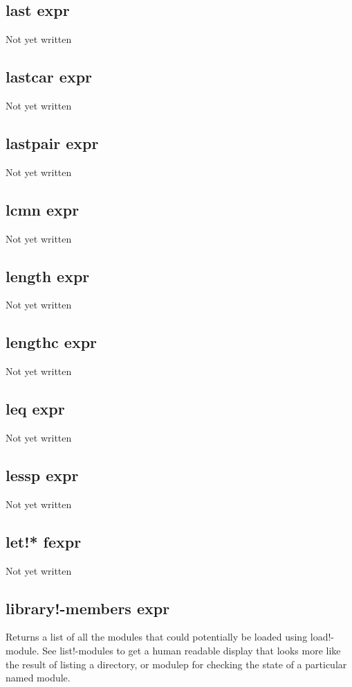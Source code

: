 \documentclass[a4paper,11pt]{article}
\begin{document}
\subsection{\ttfamily last expr}
Not yet written

\subsection{\ttfamily lastcar expr}
Not yet written

\subsection{\ttfamily lastpair expr}
Not yet written

\subsection{\ttfamily lcmn expr}
Not yet written

\subsection{\ttfamily length expr}
Not yet written

\subsection{\ttfamily lengthc expr}
Not yet written

\subsection{\ttfamily leq expr}
Not yet written

\subsection{\ttfamily lessp expr}
Not yet written

\subsection{\ttfamily let!* fexpr}
Not yet written

\subsection{\ttfamily library!-members expr}
Returns a list of all the modules that could potentially be loaded using
{\ttfamily load!-module}. See {\ttfamily list!-modules} to get a human
readable display that looks more like the result of listing a directory, or
{\ttfamily modulep} for checking the state of a particular named module.
\end{document}
